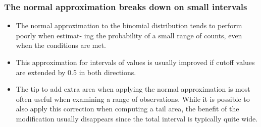 \begin{frame}
\frametitle{The normal approximation breaks down on small intervals}

\begin{itemize}

\item The normal approximation to the binomial distribution tends to perform poorly when estimat- ing the probability of a small range of counts, even when the conditions are met.

\item This approximation for intervals of values is usually improved if cutoff values are extended by 0.5 in both directions.

\item The tip to add extra area when applying the normal approximation is most often useful when examining a range of observations. While it is possible to also apply this correction when computing a tail area, the benefit of the modification usually disappears since the total interval is typically quite wide.

\end{itemize}

\end{frame}

